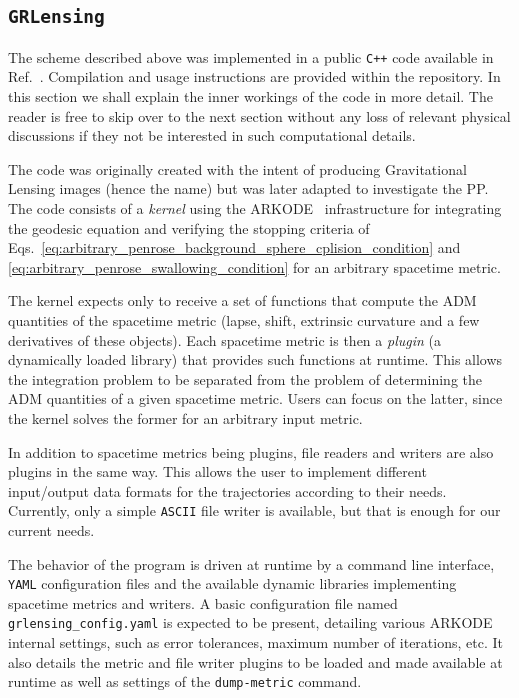 \subsection{\texttt{GRLensing}}

The scheme described above was implemented in a public \texttt{C++} code available in Ref.~\cite{GRLensingRepo}. Compilation and usage instructions are provided within the repository. In this section we shall explain the inner workings of the code in more detail. The reader is free to skip over to the next section without any loss of relevant physical discussions if they not be interested in such computational details.

The code was originally created with the intent of producing Gravitational Lensing images (hence the name) but was later adapted to investigate the \ac{PP}. The code consists of a \emph{kernel} using the ARKODE~\cite{ARKODE} infrastructure for integrating the geodesic equation and verifying the stopping criteria of Eqs.~\eqref{eq:arbitrary_penrose_background_sphere_cplision_condition} and \eqref{eq:arbitrary_penrose_swallowing_condition} for an arbitrary spacetime metric.

The kernel expects only to receive a set of functions that compute the \ac{ADM} quantities of the spacetime metric (lapse, shift, extrinsic curvature and a few derivatives of these objects). Each spacetime metric is then a \emph{plugin} (a dynamically loaded library) that provides such functions at runtime. This allows the integration problem to be separated from the problem of determining the \ac{ADM} quantities of a given spacetime metric. Users can focus on the latter, since the kernel solves the former for an arbitrary input metric. 

In addition to spacetime metrics being plugins, file readers and writers are also plugins in the same way. This allows the user to implement different input/output data formats for the trajectories according to their needs. Currently, only a simple \texttt{ASCII} file writer is available, but that is enough for our current needs.

The behavior of the program is driven at runtime by a command line interface, \texttt{YAML} configuration files and the available dynamic libraries implementing spacetime metrics and writers. A basic configuration file named \texttt{grlensing\_config.yaml} is expected to be present, detailing various ARKODE internal settings, such as error tolerances, maximum number of iterations, etc. It also details the metric and file writer plugins to be loaded and made available at runtime as well as settings of the \texttt{dump-metric} command. 

